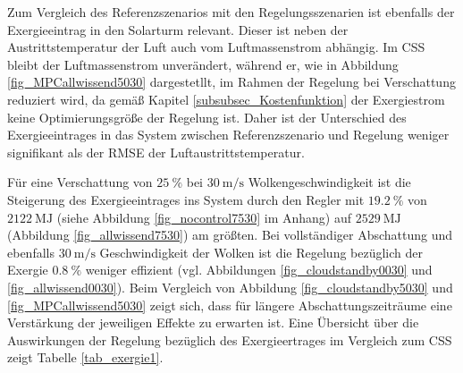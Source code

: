 Zum Vergleich des Referenzszenarios mit den Regelungsszenarien ist ebenfalls der Exergieeintrag in den Solarturm relevant.
Dieser ist neben der Austrittstemperatur der Luft auch vom Luftmassenstrom abhängig.
Im CSS bleibt der Luftmassenstrom unverändert, während er, wie in Abbildung \ref{fig_MPCallwissend5030} dargestetllt, im Rahmen der Regelung bei Verschattung reduziert wird, da gemäß Kapitel \ref{subsubsec_Kostenfunktion} der Exergiestrom keine Optimierungsgröße der Regelung ist.
Daher ist der Unterschied des Exergieeintrages in das System zwischen Referenzszenario und Regelung weniger signifikant als der RMSE der Luftaustrittstemperatur.

Für eine Verschattung von $\SI{25}{\percent}$ bei $\SI{30}{\metre\per\second}$ Wolkengeschwindigkeit ist die Steigerung des Exergieeintrages ins System durch den Regler mit $\SI{19.2}{\percent}$ von $\SI{2122}{\mega\joule}$ (siehe Abbildung \ref{fig_nocontrol7530} im Anhang) auf $\SI{2529}{\mega\joule}$ (Abbildung \ref{fig_allwissend7530}) am größten.
Bei vollständiger Abschattung und ebenfalls $\SI{30}{\metre\per\second}$ Geschwindigkeit der Wolken ist die Regelung bezüglich der Exergie $\SI{0.8}{\percent}$ weniger effizient (vgl. Abbildungen \ref{fig_cloudstandby0030} und \ref{fig_allwissend0030}).
Beim Vergleich von Abbildung \ref{fig_cloudstandby5030} und \ref{fig_MPCallwissend5030} zeigt sich, dass für längere Abschattungszeiträume eine Verstärkung der jeweiligen Effekte zu erwarten ist.
Eine Übersicht über die Auswirkungen der Regelung bezüglich des Exergieertrages im Vergleich zum CSS zeigt Tabelle \ref{tab_exergie1}.

